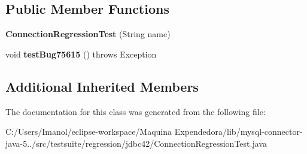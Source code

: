 \subsection*{Public Member Functions}
\begin{DoxyCompactItemize}
\item 
\mbox{\label{classtestsuite_1_1regression_1_1jdbc42_1_1_connection_regression_test_a1bc2a45cb8ce5e9c22de7260b65ca14b}} 
{\bfseries Connection\+Regression\+Test} (String name)
\item 
\mbox{\label{classtestsuite_1_1regression_1_1jdbc42_1_1_connection_regression_test_a2bbe50021fa8323a4ed30122f9756037}} 
void {\bfseries test\+Bug75615} ()  throws Exception 
\end{DoxyCompactItemize}
\subsection*{Additional Inherited Members}


The documentation for this class was generated from the following file\+:\begin{DoxyCompactItemize}
\item 
C\+:/\+Users/\+Imanol/eclipse-\/workspace/\+Maquina Expendedora/lib/mysql-\/connector-\/java-\/5../src/testsuite/regression/jdbc42/Connection\+Regression\+Test.\+java\end{DoxyCompactItemize}
